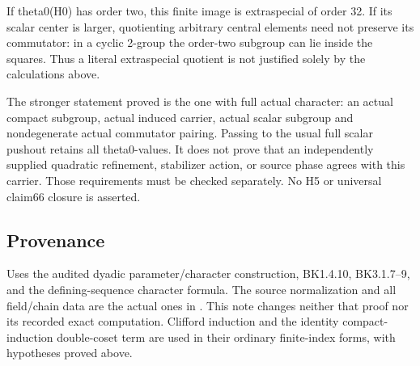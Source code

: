 If theta0(H0) has order two, this finite image is extraspecial of order
32. If its scalar center is larger, quotienting arbitrary central
elements need not preserve its commutator: in a cyclic 2-group the
order-two subgroup can lie inside the squares. Thus a literal
extraspecial quotient is not justified solely by the calculations above.

The stronger statement proved is the one with full actual character: an
actual compact subgroup, actual induced carrier, actual scalar subgroup
and nondegenerate actual commutator pairing. Passing to the usual full
scalar pushout retains all theta0-values. It does not prove that an
independently supplied quadratic refinement, stabilizer action, or
source phase agrees with this carrier. Those requirements must be
checked separately. No H5 or universal claim66 closure is asserted.

\hypertarget{rank4-provenance}{%
\subsection{Provenance}\label{rank4-provenance}}

Uses the audited dyadic parameter/character construction, BK1.4.10,
BK3.1.7--9, and the defining-sequence character formula. The source
normalization and all field/chain data are the actual ones in
. This note changes neither that
proof nor its recorded exact computation. Clifford induction and the
identity compact-induction double-coset term are used in their ordinary
finite-index forms, with hypotheses proved above.
